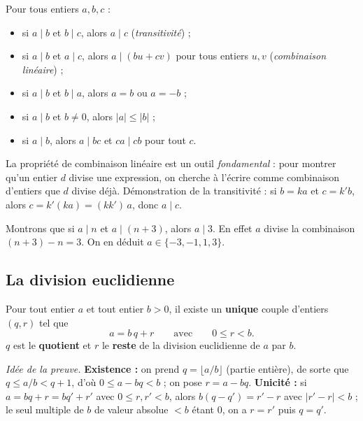 \begin{propriete}
Pour tous entiers $a,b,c$ :
\begin{itemize}
\item si $a\mid b$ et $b\mid c$, alors $a\mid c$ \quad(\emph{transitivité}) ;
\item si $a\mid b$ et $a\mid c$, alors $a\mid (bu+cv)$ pour tous entiers $u,v$ \quad(\emph{combinaison linéaire}) ;
\item si $a\mid b$ et $b\mid a$, alors $a=b$ ou $a=-b$ ;
\item si $a\mid b$ et $b\neq 0$, alors $|a|\le |b|$ ;
\item si $a\mid b$, alors $a\mid bc$ et $ca\mid cb$ pour tout $c$.
\end{itemize}
\end{propriete}

\begin{remarque}
La propriété de combinaison linéaire est un outil \emph{fondamental} : pour montrer qu'un entier $d$ divise une expression, on cherche à l'écrire comme combinaison d'entiers que $d$ divise déjà. Démonstration de la transitivité : si $b=k a$ et $c=k' b$, alors $c=k'(k a)=(k k')\,a$, donc $a\mid c$.
\end{remarque}

\begin{exemple}
Montrons que si $a\mid n$ et $a\mid (n+3)$, alors $a\mid 3$. En effet $a$ divise la combinaison $(n+3)-n=3$. On en déduit $a\in\{-3,-1,1,3\}$.
\end{exemple}

\subsection{La division euclidienne}

\begin{theoreme}
Pour tout entier $a$ et tout entier $b>0$, il existe un \textbf{unique} couple d'entiers $(q,r)$ tel que
\[
a=b\,q+r \qquad\text{avec}\qquad 0\le r<b.
\]
$q$ est le \textbf{quotient} et $r$ le \textbf{reste} de la division euclidienne de $a$ par $b$.
\end{theoreme}

\begin{remarque}
\emph{Idée de la preuve.} \textbf{Existence :} on prend $q=\big\lfloor a/b\big\rfloor$ (partie entière), de sorte que $q\le a/b<q+1$, d'où $0\le a-bq<b$ ; on pose $r=a-bq$. \textbf{Unicité :} si $a=bq+r=bq'+r'$ avec $0\le r,r'<b$, alors $b(q-q')=r'-r$ avec $|r'-r|<b$ ; le seul multiple de $b$ de valeur absolue $<b$ étant $0$, on a $r=r'$ puis $q=q'$.
\end{remarque}

